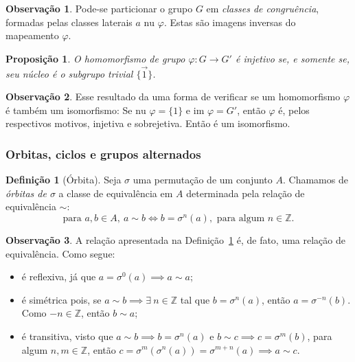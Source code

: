 \documentclass[a4paper,12pt]{report}
\theoremstyle{plain}
\newtheorem{proposicao}{Proposição}[section]
\theoremstyle{definition}
\newtheorem{definicao}{Definição}[section]
\newtheorem{observacao}{Observação}[section]
\begin{document}
	\begin{observacao}
		Pode-se particionar o grupo \(G\) em \emph{classes de congruência},
		formadas pelas classes laterais \(a\text{ nu }\varphi\). Estas são imagens
		inversas do mapeamento \(\varphi\).
	\end{observacao}
	
	\begin{proposicao}
		O homomorfismo de grupo
		\(\varphi: G\longrightarrow G'\) é injetivo se, e somente se, seu núcleo
		é o subgrupo trivial \(\{\vec 1\}\).
	\end{proposicao}
	
	\begin{observacao}
		Esse resultado da uma forma de verificar se um homomorfismo \(\varphi\)
		é também um isomorfismo: Se \(\text{nu }\varphi = \{1\}\) e
		\(\text{im } \varphi = G'\), então \(\varphi\) é, pelos respectivos
		motivos, injetiva e sobrejetiva. Então é um isomorfismo.
	\end{observacao}
	
	\subsubsection{Orbitas, ciclos e grupos alternados}
	
	\begin{definicao}[Órbita]\label{def:orbit}
		Seja $\sigma$ uma permutação de um conjunto $A$. Chamamos de \emph{órbitas de $\sigma$} a classe de equivalência em $A$ determinada pela relação de equivalência $\sim$:
		$$\text{para }a,b \in A,\ a\sim b \iff b=\sigma^n(a), \text{ para algum }n\in\mathbb{Z}.$$
	\end{definicao}
	
	\begin{observacao}
		A relação apresentada na Definição~\ref{def:orbit} é, de fato, uma relação de equivalência. Como segue:
		\begin{itemize}
			\item é reflexiva, já que $a = \sigma^0(a) \implies a\sim a$;
			\item é simétrica pois, se $a\sim b \implies \exists\  n\in \mathbb{Z}$ tal que $b = \sigma^n(a)$, então $a = \sigma^{-n}(b)$. Como $-n\in\mathbb{Z}$, então $b\sim a$;
			\item é transitiva, visto que $a\sim b \implies b=\sigma^n(a)$ e $b \sim c \implies c = \sigma^m(b)$, para algum $n,m\in\mathbb{Z}$, então $c=\sigma^m(\sigma^n(a)) = \sigma^{m+n}(a) \implies a\sim c$.
		\end{itemize}
	\end{observacao}
	
\end{document}
